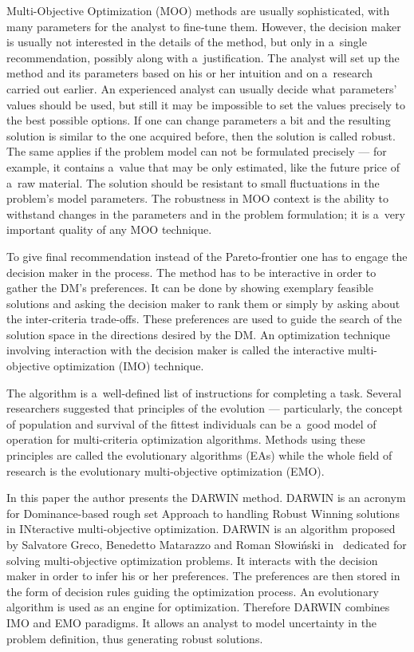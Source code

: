Multi-Objective Optimization (MOO) methods are usually sophisticated, with
many parameters for the analyst to fine-tune them. However, the decision maker
is usually not interested in the details of the method, but only in a~single
recommendation, possibly along with a~justification. The analyst will set up
the method and its parameters based on his or her intuition and on a~research
carried out earlier. An experienced analyst can usually decide what
parameters' values should be used, but still it may be impossible to set the
values precisely to the best possible options. If one can change parameters a
bit and the resulting solution is similar to the one acquired before, then the
solution is called robust. The same applies if the problem model can not be
formulated precisely --- for example, it contains a~value that may be only
estimated, like the future price of a~raw material. The solution should be
resistant to small fluctuations in the problem's model parameters. The
robustness in MOO context is the ability to withstand changes in the
parameters and in the problem formulation; it is a~very important quality of
any MOO technique.

To give final recommendation instead of the Pareto-frontier one has to engage
the decision maker in the process. The method has to be interactive in order
to gather the DM's preferences. It can be done by showing exemplary feasible
solutions and asking the decision maker to rank them or simply by asking about
the inter-criteria trade-offs. These preferences are used to guide the search
of the solution space in the directions desired by the DM. An optimization
technique involving interaction with the decision maker is called the
interactive multi-objective optimization (IMO) technique.

The algorithm is a~well-defined list of instructions for completing a
task. Several researchers suggested that principles of the evolution ---
particularly, the concept of population and survival of the fittest
individuals can be a~good model of operation for multi-criteria optimization
algorithms. Methods using these principles are called the evolutionary
algorithms (EAs) while the whole field of research is the evolutionary
multi-objective optimization (EMO).

In this paper the author presents the DARWIN method. DARWIN is an acronym for
Dominance-based rough set Approach to handling Robust Winning solutions in
INteractive multi-objective optimization. DARWIN is an algorithm proposed by
Salvatore Greco, Benedetto Matarazzo and Roman Słowiński in~\cite{GMS10c,
  GMS10, GMS09, GMS10b} dedicated for solving multi-objective optimization
problems. It interacts with the decision maker in order to infer his or her
preferences. The preferences are then stored in the form of decision rules
guiding the optimization process. An evolutionary algorithm is used as an
engine for optimization. Therefore DARWIN combines IMO and EMO paradigms. It
allows an analyst to model uncertainty in the problem definition, thus
generating robust solutions.

